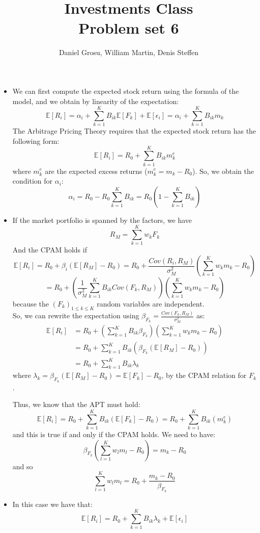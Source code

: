 \documentclass[10pt]{article}
\newcommand{\Ebb}{\mathbb{E}}
\newenvironment{exercise}[2][Exercise]{\begin{trivlist}
  \item[\hskip \labelsep {\bfseries #1}\hskip \labelsep {\bfseries #2.}]}{\end{trivlist}}
\begin{document}
	
  \renewcommand{\qedsymbol}{\smiley}
	\title{Investments Class \\ Problem set 6}
	\author{Daniel Grosu, William Martin, Denis Steffen}
		
\maketitle

\begin{exercise}{1}
  \begin{itemize}
    \item We can first compute the expected stock return using the formula of the model, and we obtain by linearity of the expectation: 
     $$ \Ebb[R_i] = \alpha_i + \sum_{k=1}^K B_{ik}\Ebb[F_k] + \Ebb[\epsilon_i] = \alpha_i + \sum_{k=1}^K B_{ik}m_k $$
     The Arbitrage Pricing Theory requires that the expected stock return has the following form: $$ \Ebb[R_i] = R_0 + \sum_{k=1}^K B_{ik}m_k^e$$ where $m_k^e$ are the expected excess returns ($m_k^e = m_k - R_0$). 
     So, we obtain the condition for $\alpha_i$: 
     $$ \alpha_i = R_0 - R_0\sum_{k=1}^K B_{ik} = R_0(1-\sum_{k=1}^KB_{ik})$$
    \item If the market portfolio is spanned by the factors, we have $$ R_M = \sum_{k=1}^Kw_kF_k$$ And the CPAM holds if $$ \Ebb[R_i] = R_0 + \beta_i(\Ebb[R_M]-R_0) = R_0 + \frac{Cov(R_i,R_M)}{\sigma_M^2}(\sum_{k=1}^Kw_km_k-R_0)$$
    $$ = R_0 + \left(\frac{1}{\sigma_M^2}\sum_{k=1}^KB_{ik}Cov(F_k,R_M)\right)(\sum_{k=1}^Kw_km_k-R_0)$$ because the $(F_k)_{1\leq k\leq K}$ random variables are independent.
    \\
    So, we can rewrite the expectation using $\beta_{F_k} = \frac{Cov(F_k,R_M)}{\sigma_M^2}$ as: 
    \begin{align*}
      \Ebb[R_i] &= R_0 + \left(\sum_{k=1}^K B_{ik}\beta_{F_k}\right)\left(\sum_{k=1}^Kw_km_k-R_0\right) \\
      &= R_0 + \sum_{k=1}^K B_{ik}(\beta_{F_k}(\Ebb[R_M]-R_0)) \\
      &= R_0 + \sum_{k=1}^K B_{ik}\lambda_k
    \end{align*} where $ \lambda_k = \beta_{F_k}(\Ebb[R_M]-R_0) = \Ebb[F_k] - R_0$, by the CPAM relation for $F_k$.

    Thus, we know that the APT must hold: 
    $$ \Ebb[R_i] = R_0 + \sum_{k=1}^K B_{ik}(\Ebb[F_k] - R_0) = R_0 + \sum_{k=1}^K B_{ik}(m_k^e)$$ and this is true if and only if the CPAM holds.
    We need to have: $$ \beta_{F_k}(\sum_{l=1}^K w_lm_l - R_0) = m_k - R_0$$ and so $$ \sum_{l=1}^K w_lm_l = R_0 + \frac{m_k-R_0}{\beta_{F_k}}$$
    \item In this case we have that: 
    $$ \Ebb[R_i] = R_0 + \sum_{k=1}^K B_{ik}\lambda_k + \Ebb[\epsilon_i]$$

  \end{itemize}
	
\end{exercise}
  
\end{document}
